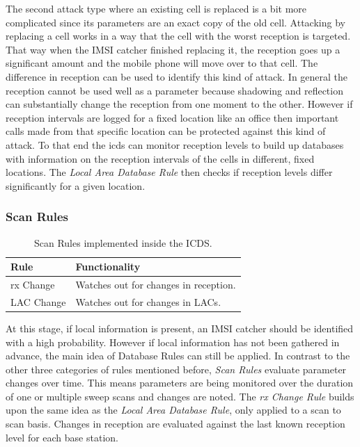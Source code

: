The second attack type where an existing cell is replaced is a bit more complicated since its parameters are an exact copy of the old cell.
Attacking by replacing a cell works in a way that the cell with the worst reception is targeted.
That way when the IMSI catcher finished replacing it, the reception goes up a significant amount and the mobile phone will move over to that cell.
The difference in reception can be used to identify this kind of attack.
In general the reception cannot be used well as a parameter because shadowing and reflection can substantially change the reception from one moment to the other.
However if reception intervals are logged for a fixed location like an office then important calls made from that specific location can be protected against this kind of attack.
To that end the \gls{icds} can monitor reception levels to build up databases with information on the reception intervals of the cells in different, fixed locations.
The \emph{Local Area Database Rule} then checks if reception levels differ significantly for a given location.

\subsubsection{Scan Rules}
\begin{table}
\centering
\begin{tabular}{ll}
\toprule
Rule					&Functionality\\
\midrule
rx Change		 		&Watches out for changes in reception.\\
LAC Change				&Watches out for changes in LACs.\\
\bottomrule
\end{tabular}
\caption{Scan Rules implemented inside the ICDS.}
\label{tab:scan_rules}
\end{table}
At this stage, if local information is present, an IMSI catcher should be identified with a high probability.
However if local information has not been gathered in advance, the main idea of Database Rules can still be applied.
In contrast to the other three categories of rules mentioned before, \emph{Scan Rules} evaluate parameter changes over time.
This means parameters are being monitored over the duration of one or multiple sweep scans and changes are noted.
The \emph{rx Change Rule} builds upon the same idea as the \emph{Local Area Database Rule}, only applied to a scan to scan basis.
Changes in reception are evaluated against the last known reception level for each base station.

